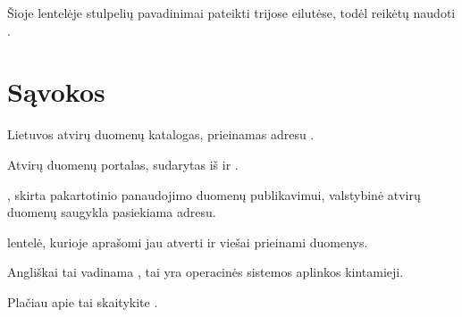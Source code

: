 \documentclass[letterpaper,10pt,lithuanian]{sphinxmanual}
\begin{document}
\sphinxAtStartPar
Šioje lentelėje stulpelių pavadinimai pateikti trijose eilutėse, todėl
 reikėtų naudoti {\hyperref[\detokenize{formules:header}]{}}.

\sphinxstepscope


\section{Sąvokos}
\label{\detokenize{savokos:savokos}}\label{\detokenize{savokos::doc}}\begin{description}
\sphinxAtStartPar
Lietuvos atvirų duomenų katalogas, prieinamas adresu .

\sphinxAtStartPar
Atvirų duomenų portalas, sudarytas iš {\hyperref[\detokenize{savokos:term-ADK}]{}} ir {\hyperref[\detokenize{savokos:term-ADS}]{}}.

\sphinxAtStartPar
{}, skirta pakartotinio
panaudojimo duomenų publikavimui, valstybinė atvirų duomenų saugykla
pasiekiama  adresu.

\sphinxAtStartPar
{\hyperref[\detokenize{savokos:term-DSA}]{}} lentelė, kurioje aprašomi jau atverti ir viešai prieinami
duomenys.

\sphinxAtStartPar
Angliškai tai vadinama , tai yra operacinės
sistemos aplinkos kintamieji.

\sphinxAtStartPar
Plačiau apie tai skaitykite .


\end{description}
\end{document}
